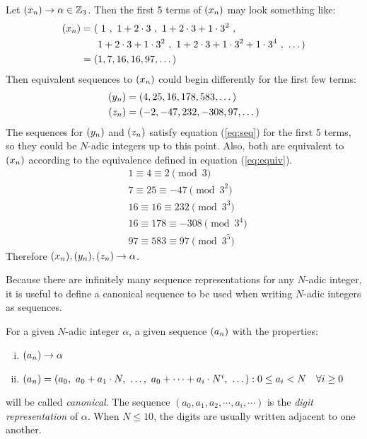 \begin{example} \label{ex:equiv-seq}
  Let $(x_n) \rightarrow \alpha \in \mathbb{Z}_3$. Then the first 5 terms of
  $(x_n)$ may look something like:
  \begin{align*}
    (x_n) = (&\ 1\ , \ 1+2\cdot3 \ , \ 1+2\cdot3+1\cdot3^2 \ ,\\
            &1+2\cdot3+1\cdot3^2 \ , \ 1+2\cdot3+1\cdot3^2+1\cdot3^4 \ ,
              \ \dots)\\
        = (&1,7,16,16,97,\dots)
  \end{align*}
  Then equivalent sequences to $(x_n)$ could begin differently for the first
  few terms:
  \begin{align*}
    (y_n) &= (4,25,16,178,583,\dots) \\
    (z_n) &= (-2,-47,232,-308,97,\dots)
  \end{align*}
  The sequences for $(y_n)$ and $(z_n)$ satisfy equation (\ref{eq:seq}) for the
  first 5 terms, so they could be $N$-adic integers up to this point. Also,
  both are equivalent to $(x_n)$ according to the equivalence defined in
  equation (\ref{eq:equiv}).
  \begin{align*}
    &1 \equiv 4 \equiv 2 \pmod 3 \\
    &7 \equiv 25 \equiv -47 \pmod{3^2} \\
    &16 \equiv 16 \equiv 232 \pmod{3^3} \\
    &16 \equiv 178 \equiv -308 \pmod{3^4} \\
    &97 \equiv 583 \equiv 97 \pmod{3^5}
  \end{align*}
  Therefore $(x_n),(y_n),(z_n) \rightarrow \alpha$.
\end{example}

\par Because there are infinitely many sequence representations for any
$N$-adic integer, it is useful to define a canonical sequence to be used
when writing $N$-adic integers as sequences.
  
\begin{definition}
\label{def:canon}
  For a given $N$-adic integer $\alpha$, a given sequence $(a_n)$ with
  the properties:
  \begin{enumerate}[i.]
    \item $(a_n) \rightarrow \alpha$
    \item $\an=(a_0, \ a_0+a_1\cdot N, \ \dots, \ a_0+\dots+a_i\cdot N^i, \ \dots) : 0 \leq a_i < N \ \ \ \forall i \geq 0$
  \end{enumerate}
  will be called {\em canonical}. The sequence
  $(a_0,a_1,a_2,\cdots,a_i,\cdots)$ is the {\em digit representation} of
  $\alpha$. When $N\leq10$, the digits are usually written adjacent to one
  another.
\end{definition}

